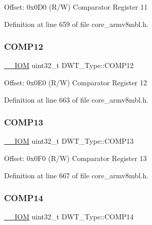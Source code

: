 Offset\+: 0x0\+D0 (R/W) Comparator Register 11 

Definition at line 659 of file core\+\_\+armv8mbl.\+h.

\mbox{\label{struct_d_w_t___type_a9115fd187d8cbcb9d6ec5eba938b81ea}} 
\subsubsection{\texorpdfstring{C\+O\+M\+P12}{COMP12}}
{\footnotesize\ttfamily \hyperlink{core__sc300_8h_ab6caba5853a60a17e8e04499b52bf691}{\+\_\+\+\_\+\+I\+OM} uint32\+\_\+t D\+W\+T\+\_\+\+Type\+::\+C\+O\+M\+P12}

Offset\+: 0x0\+E0 (R/W) Comparator Register 12 

Definition at line 663 of file core\+\_\+armv8mbl.\+h.

\mbox{\label{struct_d_w_t___type_abc29ac14df61ec3f8f3d28ca92892d8a}} 
\subsubsection{\texorpdfstring{C\+O\+M\+P13}{COMP13}}
{\footnotesize\ttfamily \hyperlink{core__sc300_8h_ab6caba5853a60a17e8e04499b52bf691}{\+\_\+\+\_\+\+I\+OM} uint32\+\_\+t D\+W\+T\+\_\+\+Type\+::\+C\+O\+M\+P13}

Offset\+: 0x0\+F0 (R/W) Comparator Register 13 

Definition at line 667 of file core\+\_\+armv8mbl.\+h.

\mbox{\label{struct_d_w_t___type_a85368a4ec78f4074e5f9cbba92ae1eb9}} 
\subsubsection{\texorpdfstring{C\+O\+M\+P14}{COMP14}}
{\footnotesize\ttfamily \hyperlink{core__sc300_8h_ab6caba5853a60a17e8e04499b52bf691}{\+\_\+\+\_\+\+I\+OM} uint32\+\_\+t D\+W\+T\+\_\+\+Type\+::\+C\+O\+M\+P14}

